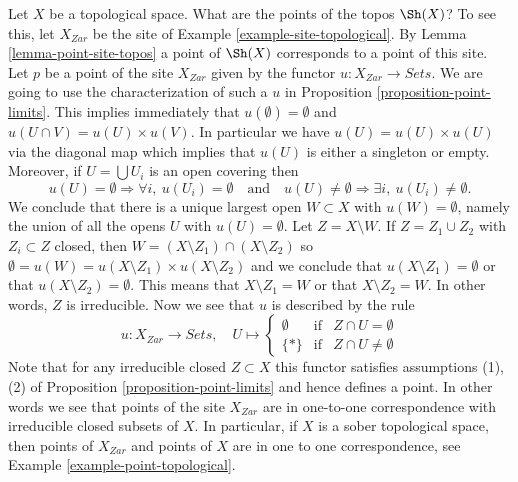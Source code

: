 \begin{example}
\label{example-point-topology}
Let $X$ be a topological space. What are the points of the topos
$\Sh(X)$? To see this, let $X_{Zar}$ be the site of
Example \ref{example-site-topological}.
By
Lemma \ref{lemma-point-site-topos}
a point of $\Sh(X)$ corresponds to a point of this site.
Let $p$ be a point of the site $X_{Zar}$ given by the functor
$u : X_{Zar} \to \textit{Sets}$. We are going to use the
characterization of such a $u$ in
Proposition \ref{proposition-point-limits}.
This implies immediately that $u(\emptyset) = \emptyset$ and
$u(U \cap V) = u(U) \times u(V)$. In particular we have
$u(U) = u(U) \times u(U)$ via the diagonal map which implies that $u(U)$
is either a singleton or empty. Moreover, if $U = \bigcup U_i$ is an
open covering then
$$
u(U) = \emptyset \Rightarrow \forall i, \ u(U_i) = \emptyset
\quad\text{and}\quad
u(U) \not = \emptyset \Rightarrow \exists i, \ u(U_i) \not = \emptyset.
$$
We conclude that there is a unique largest open $W \subset X$ with
$u(W) = \emptyset$, namely the union of all the opens $U$ with
$u(U) = \emptyset$. Let $Z = X \setminus W$. If $Z = Z_1 \cup Z_2$ with
$Z_i \subset Z$ closed, then $W = (X \setminus Z_1) \cap (X \setminus Z_2)$
so $\emptyset = u(W) = u(X \setminus Z_1) \times u(X \setminus Z_2)$
and we conclude that $u(X \setminus Z_1) = \emptyset$ or that
$u(X \setminus Z_2) = \emptyset$. This means that $X \setminus Z_1 = W$
or that $X \setminus Z_2 = W$. In other words, $Z$ is irreducible.
Now we see that $u$ is described by the rule
$$
u : X_{Zar} \longrightarrow \textit{Sets}, \quad
U \mapsto
\left\{
\begin{matrix}
\emptyset & \text{if} & Z \cap U = \emptyset \\
\{*\} & \text{if} & Z \cap U \not = \emptyset
\end{matrix}
\right.
$$
Note that for any irreducible closed $Z \subset X$ this
functor satisfies assumptions (1), (2) of
Proposition \ref{proposition-point-limits}
and hence defines a point. In other words we see that points of
the site $X_{Zar}$ are in one-to-one correspondence with
irreducible closed subsets of $X$. In particular, if $X$ is
a sober topological space, then points of $X_{Zar}$ and
points of $X$ are in one to one correspondence, see
Example \ref{example-point-topological}.
\end{example}

